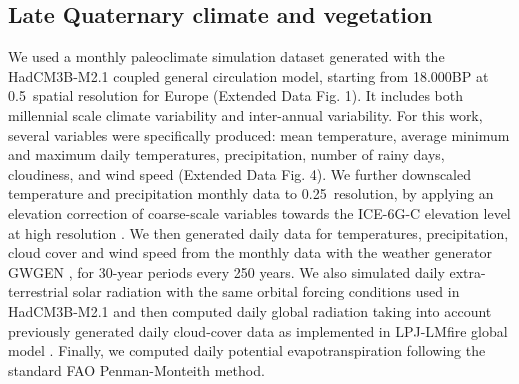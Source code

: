 \documentclass[pdflatex, sn-nature]{sn-jnl}%
\begin{document}
\subsection{Late Quaternary climate and vegetation}\label{paleodata}

We used a monthly paleoclimate simulation dataset \cite{Armstrong2019} generated with the HadCM3B-M2.1 coupled general circulation model, starting from 18.000BP at 0.5\degree~spatial resolution for Europe (Extended Data Fig. 1). It includes both millennial scale climate variability and inter-annual variability. For this work, several variables were specifically produced: mean temperature, average minimum and maximum daily temperatures, precipitation, number of rainy days, cloudiness, and wind speed (Extended Data Fig. 4). We further downscaled temperature and precipitation monthly data to 0.25\degree~resolution, by applying an elevation correction of coarse-scale variables towards the ICE-6G-C elevation level at high resolution \cite{Peltier2015}.  
We then generated daily data for temperatures, precipitation, cloud cover and wind speed from  the monthly data with the weather generator GWGEN \cite{Sommer2017}, for 30-year periods every 250 years. We also simulated daily extra-terrestrial solar radiation with the same orbital forcing conditions used in HadCM3B-M2.1 \cite{Armstrong2019} and then computed daily global radiation taking into account previously generated daily cloud-cover data as implemented in LPJ-LMfire global model \cite{Pfeiffer2013}. Finally, we computed daily potential evapotranspiration following the standard FAO Penman-Monteith method.  
\end{document}
